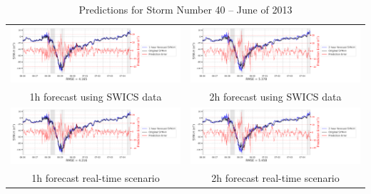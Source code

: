 \documentclass[draft,sw]{agutexSI2019}
\begin{document}
\begin{table}
\centering
\begin{tabular}{cc}
\includegraphics[width=0.49\linewidth]{paper_plots_shade/1h_swics/1h_swics_storm_40.png}
&
\includegraphics[width=0.49\linewidth]{paper_plots_shade/2h_swics/2h_swics_storm_40.png}
\\
1h forecast using SWICS data & 2h forecast using SWICS data
\vspace*{12pt}
\\
\includegraphics[width=0.49\linewidth]{paper_plots_shade/1h_rt/1h_rt_storm_40.png}
&
\includegraphics[width=0.49\linewidth]{paper_plots_shade/2h_rt/2h_rt_storm_40.png}
\\
1h forecast real-time scenario & 2h forecast real-time scenario 
\vspace*{12pt}
\\
\end{tabular}
\caption{Predictions for Storm Number 40 -- June of 2013}
\label{storm-40}
\end{table}
\end{document}
